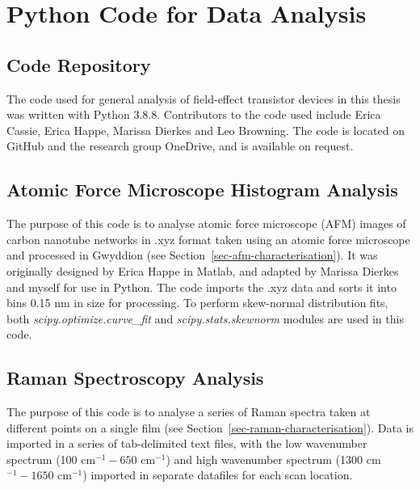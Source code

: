 \documentclass[
  a4paper,
]{scrbook}
\begin{document}
\hypertarget{python-code-for-data-analysis}{%
\chapter{Python Code for Data
Analysis}\label{python-code-for-data-analysis}}

\hypertarget{code-repository}{%
\section{Code Repository}\label{code-repository}}

The code used for general analysis of field-effect transistor devices in
this thesis was written with Python 3.8.8. Contributors to the code used
include Erica Cassie, Erica Happe, Marissa Dierkes and Leo Browning. The
code is located on GitHub and the research group OneDrive, and is
available on request.

\hypertarget{sec-histogram-analysis}{%
\section{Atomic Force Microscope Histogram
Analysis}\label{sec-histogram-analysis}}

The purpose of this code is to analyse atomic force microscope (AFM)
images of carbon nanotube networks in .xyz format taken using an atomic
force microscope and processed in Gwyddion (see
Section~\ref{sec-afm-characterisation}). It was originally designed by
Erica Happe in Matlab, and adapted by Marissa Dierkes and myself for use
in Python. The code imports the .xyz data and sorts it into bins 0.15 nm
in size for processing. To perform skew-normal distribution fits, both
\emph{scipy.optimize.curve\_fit} and \emph{scipy.stats.skewnorm} modules
are used in this code.

\hypertarget{sec-raman-analysis}{%
\section{Raman Spectroscopy Analysis}\label{sec-raman-analysis}}

The purpose of this code is to analyse a series of Raman spectra taken
at different points on a single film (see
Section~\ref{sec-raman-characterisation}). Data is imported in a series
of tab-delimited text files, with the low wavenumber spectrum (100
cm\(^{-1} - 650\) cm\(^{-1}\)) and high wavenumber spectrum (1300
cm\(^{-1} - 1650\) cm\(^{-1}\)) imported in separate datafiles for each
scan location.
\end{document}
